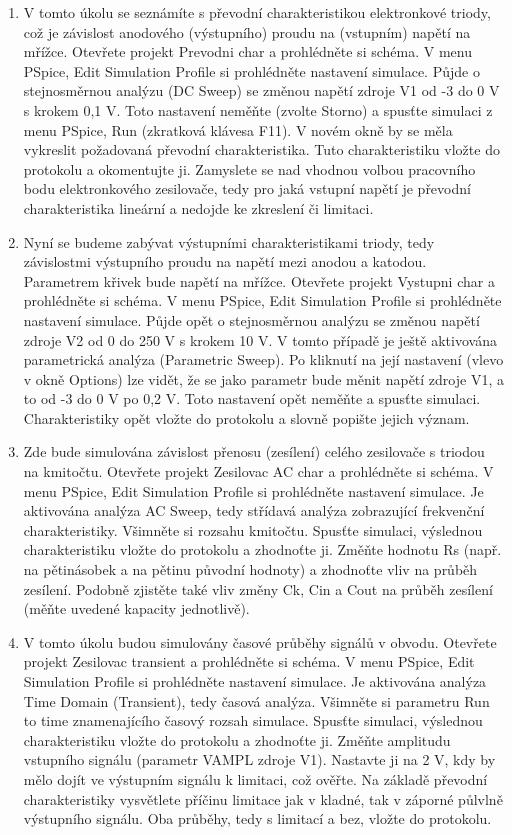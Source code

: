 \documentclass[a4paper, czech]{article}
\begin{document}
\begin{enumerate}
    \item V tomto úkolu se seznámíte s převodní charakteristikou elektronkové triody, což je závislost anodového (výstupního) proudu na (vstupním) napětí na mřížce. Otevřete projekt Prevodni char a prohlédněte si schéma. V menu PSpice, Edit Simulation Profile si prohlédněte nastavení simulace. Půjde o stejnosměrnou analýzu (DC Sweep) se změnou napětí zdroje V1 od -3 do 0 V s krokem 0,1 V. Toto nastavení neměňte (zvolte Storno) a spusťte simulaci z menu PSpice, Run (zkratková klávesa F11). V novém okně by se měla vykreslit požadovaná převodní charakteristika. Tuto charakteristiku vložte do protokolu a okomentujte ji. Zamyslete se nad vhodnou volbou pracovního bodu elektronkového zesilovače, tedy pro jaká vstupní napětí je převodní charakteristika lineární a nedojde ke zkreslení či limitaci.
    \item Nyní se budeme zabývat výstupními charakteristikami triody, tedy závislostmi výstupního proudu na napětí mezi anodou a katodou. Parametrem křivek bude napětí na mřížce. Otevřete projekt Vystupni char a prohlédněte si schéma. V menu PSpice, Edit Simulation Profile si prohlédněte nastavení simulace. Půjde opět o stejnosměrnou analýzu se změnou napětí zdroje V2 od 0 do 250 V s krokem 10 V. V tomto případě je ještě aktivována parametrická analýza (Parametric Sweep). Po kliknutí na její nastavení (vlevo v okně Options) lze vidět, že se jako parametr bude měnit napětí zdroje V1, a to od -3 do 0 V po 0,2 V. Toto nastavení opět neměňte a spusťte simulaci. Charakteristiky opět vložte do protokolu a slovně popište jejich význam.
    \item Zde bude simulována závislost přenosu (zesílení) celého zesilovače s triodou na kmitočtu. Otevřete projekt Zesilovac AC char a prohlédněte si schéma. V menu PSpice, Edit Simulation Profile si prohlédněte nastavení simulace. Je aktivována analýza AC Sweep, tedy střídavá analýza zobrazující frekvenční charakteristiky. Všimněte si rozsahu kmitočtu. Spusťte simulaci, výslednou charakteristiku vložte do protokolu a zhodnoťte ji. Změňte hodnotu Rs (např. na pětinásobek a na pětinu původní hodnoty) a zhodnoťte vliv na průběh zesílení. Podobně zjistěte také vliv změny Ck, Cin a Cout na průběh zesílení (měňte uvedené kapacity jednotlivě).
    \item V tomto úkolu budou simulovány časové průběhy signálů v obvodu. Otevřete projekt Zesilovac transient a prohlédněte si schéma. V menu PSpice, Edit Simulation Profile si prohlédněte nastavení simulace. Je aktivována analýza Time Domain (Transient), tedy časová analýza. Všimněte si parametru Run to time znamenajícího časový rozsah simulace. Spusťte simulaci, výslednou charakteristiku vložte do protokolu a zhodnoťte ji. Změňte amplitudu vstupního signálu (parametr VAMPL zdroje V1). Nastavte ji na 2 V, kdy by mělo dojít ve výstupním signálu k limitaci, což ověřte. Na základě převodní charakteristiky vysvětlete příčinu limitace jak v kladné, tak v záporné půlvlně výstupního signálu. Oba průběhy, tedy s limitací a bez, vložte do protokolu.

\end{enumerate}
\end{document}
